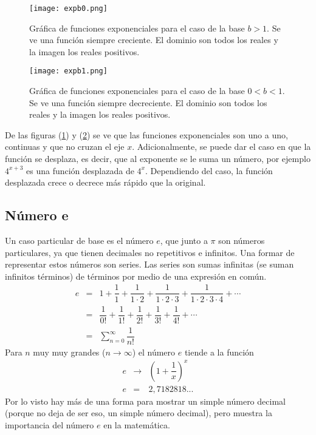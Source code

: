  \begin{center}
\begin{figure}[h!]
\centering
\texttt{[image: expb0.png]}
\caption[Gráfica de funciones exponenciales para el caso de la base $b>1$.]{Gráfica de funciones exponenciales para el caso de la base $b>1$. Se ve una función siempre creciente. El dominio son todos los reales y la imagen los reales positivos.} \label{expb0}
\end{figure}
\end{center}

 \begin{center}
\begin{figure}[h!]
\centering
\texttt{[image: expb1.png]}
\caption[Gráfica de funciones exponenciales para el caso de la base $0<b<1$]{Gráfica de funciones exponenciales para el caso de la base $0<b<1$. Se ve una función siempre decreciente. El dominio son todos los reales y la imagen los reales positivos.} \label{expb1}
\end{figure}
\end{center}

De las figuras (\ref{expb0}) y (\ref{expb1}) se ve que las funciones exponenciales son uno a uno, continuas y que no cruzan el eje $x$. Adicionalmente, se puede dar el caso en que la función se desplaza, es decir, que al exponente se le suma un número, por ejemplo $4^{x+3}$ es una función desplazada de $4^{x}$. Dependiendo del caso, la función desplazada crece o decrece más rápido que la original.
\newpage
\subsection{Número e}

Un caso particular de base es el número $e$, que junto a $\pi$ son números particulares, ya que tienen decimales no repetitivos e infinitos. Una formar de representar estos números son series. Las series son sumas infinitas (se suman infinitos términos) de términos por medio de una expresión en común. 
\begin{eqnarray*}
e&=&1 + \dfrac{1}{1} + \dfrac{1}{1\cdot 2} + \dfrac{1}{1\cdot 2\cdot 3} + \dfrac{1}{1\cdot 2\cdot 3\cdot 4}+\cdots \\
&=&\dfrac{1}{0!} + \dfrac{1}{1!} + \dfrac{1}{ 2!} + \dfrac{1}{3!} + \dfrac{1}{4!}+\cdots \\
&=&\sum_{n=0}^{\infty}\dfrac{1}{n!}
\end{eqnarray*}
Para $n$ muy muy grandes ($n\rightarrow \infty$) el número $e$ tiende a la función
\begin{eqnarray*}
e&\rightarrow &\left(1+\dfrac{1}{x}\right)^{x} \\
e&=&2,7182818...
\end{eqnarray*} 
Por lo visto hay más de una forma para mostrar un simple número decimal (porque no deja de ser eso, un simple número decimal), pero muestra la importancia del número $e$ en la matemática.

